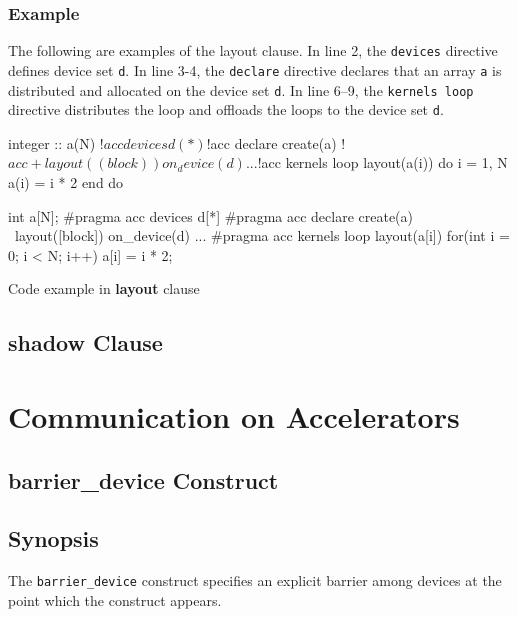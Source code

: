 \subsubsection*{Example}
The following are examples of the layout clause.
In line 2, the {\tt devices} directive defines device set {\tt d}.
In line 3-4, the {\tt declare} directive declares that an array {\tt a} is distributed and allocated on the device set {\tt d}.
In line 6--9, the {\tt kernels loop} directive distributes the loop and offloads the loops to the device set {\tt d}.
%
\begin{myfigure}
\begin{minipage}{0.47\hsize}
\begin{center}
\begin{XACCFexampleL}
integer :: a(N)
!$acc devices d(*)
!$acc declare create(a)
!$acc+layout((block)) on_device(d)
...
!$acc kernels loop layout(a(i))
do i = 1, N
  a(i) = i * 2
end do
\end{XACCFexampleL}
\end{center}
\end{minipage}
%
\begin{minipage}{0.48\hsize}
\begin{center}
\begin{XACCCexampleR}
int a[N];
#pragma acc devices d[*]
#pragma acc declare create(a) \
        layout([block]) on_device(d)
...
#pragma acc kernels loop layout(a[i])
for(int i = 0; i < N; i++){
  a[i] = i * 2;
}
\end{XACCCexampleR}
\end{center}
\end{minipage}
\caption{Code example in {\XACC} {\bf layout} clause}\label{code:layout_clause}
\end{myfigure}

\subsection{shadow Clause}



\section{Communication on Accelerators}
\subsection{barrier\_device Construct}
\subsection*{Synopsis}
The {\tt barrier\_device} construct specifies an explicit barrier among devices at the point which the construct appears.

